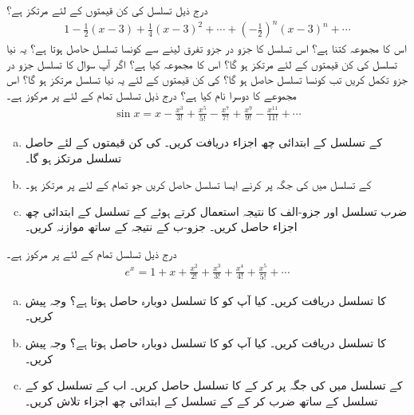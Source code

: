درج ذیل تسلسل  کی کن قیمتوں کے لئے مرتکز ہے؟
\begin{align*}
1-\frac{1}{2}(x-3)+\frac{1}{4}(x-3)^2+\cdots+(-\frac{1}{2})^n(x-3)^n+\cdots
\end{align*}
اس کا مجموعہ کتنا ہے؟ اس تسلسل کا جزو در جزو تفرق لینے سے کونسا تسلسل حاصل ہوتا ہے؟ یہ نیا تسلسل  کی کن قیمتوں کے لئے مرتکز ہو گا؟ اس کا مجموعہ کیا ہے؟
اگر آپ سوال  کا تسلسل جزو در جزو تکمل کریں تب کونسا تسلسل حاصل ہو گا؟  کی کن قیمتوں کے لئے یہ نیا تسلسل مرتکز ہو گا؟ اس مجموعے کا دوسرا نام کیا ہے؟
درج ذیل تسلسل تمام  کے لئے  پر مرکوز ہے۔
\begin{align*}
\sin x=x-\frac{x^3}{3!}+\frac{x^5}{5!}-\frac{x^7}{7!}+\frac{x^9}{9!}-\frac{x^{11}}{11!}+\cdots
\end{align*}
\begin{enumerate}[a.]
\item
  کے تسلسل کے ابتدائی چھ اجزاء دریافت کریں۔  کی کن قیمتوں کے لئے حاصل تسلسل مرتکز ہو گا۔  
\item
{} کے تسلسل میں  کی جگہ  پر کرنے ایسا تسلسل حاصل کریں جو تمام  کے لئے  پر مرتکز ہو۔
\item
ضرب تسلسل اور جزو-الف کا نتیجہ استعمال کرتے ہوئے  کے تسلسل کے ابتدائی چھ اجزاء حاصل کریں۔ جزو-ب کے نتیجہ کے ساتھ موازنہ کریں۔
\end{enumerate}
درج ذیل تسلسل تمام  کے لئے  پر مرکوز ہے۔
\begin{align*}
e^x=1+x+\frac{x^2}{2!}+\frac{x^3}{3!}+\frac{x^4}{4!}+\frac{x^5}{5!}+\cdots
\end{align*}
\begin{enumerate}[a.]
\item
{} کا تسلسل دریافت کریں۔ کیا آپ کو  کا تسلسل دوبارہ حاصل ہوتا ہے؟ وجہ پیش کریں۔
\item
{} کا تسلسل دریافت کریں۔ کیا آپ کو  کا تسلسل دوبارہ حاصل ہوتا ہے؟ وجہ پیش کریں۔
\item
{} کے تسلسل میں  کی جگہ  پر کر کے  کا تسلسل حاصل کریں۔ اب  کے تسلسل کو   کے تسلسل کے ساتھ ضرب کر کے  کے تسلسل کے ابتدائی چھ اجزاء تلاش کریں۔
\end{enumerate}

